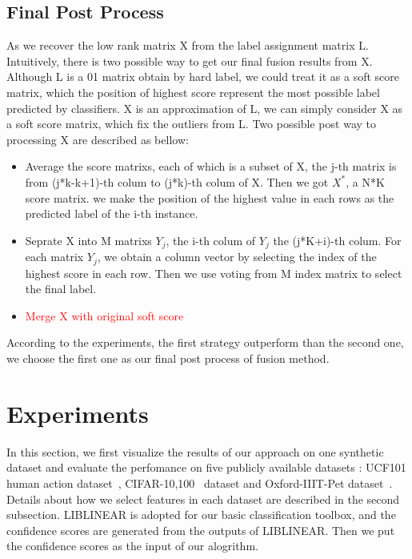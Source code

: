 \documentclass[letterpaper]{article}
\def\yanred{\textcolor{red}}
\begin{document}
\subsection{Final Post Process}
As we recover the low rank matrix X from the label assignment matrix L. Intuitively, there is two possible way to get our final fusion results from X. Although L is a 01 matrix obtain by hard label, we could treat it as a soft score matrix, which the position of highest score represent the most possible label predicted by classifiers. X is an approximation of L, we can simply consider X as a soft score matrix, which fix the outliers from L. Two possible post way to processing X are described as bellow:
\begin{itemize}
  \item Average the score matrixs, each of which is a subset of X, the j-th matrix is from (j*k-k+1)-th colum to (j*k)-th colum of X. Then we got $X^*$, a N*K score matrix. we make the position of the highest value in each rows as the predicted label of the i-th instance.
  \item Seprate X into M matrixs $Y_j$, the i-th colum of $Y_j$ the (j*K+i)-th colum. For each matrix $Y_j$, we obtain a column vector by selecting the index of the highest score in each row. Then we use voting from M index matrix to select the final label.
  \item \yanred{Merge X with original soft score}
\end{itemize}
According to the experiments, the first strategy outperform than the second one, we choose the first one as our final post process of fusion method.


\section{Experiments}

In this section, we first visualize the results of our approach on one synthetic dataset and evaluate the perfomance on five publicly available datasets : UCF101 human action dataset~\cite{soomro2012ucf101}, CIFAR-10,100~\cite{krizhevsky2009learning} dataset and Oxford-IIIT-Pet dataset~\cite{parkhi12a}. 
Details about how we select features in each dataset are described in the second subsection.
LIBLINEAR\cite{fan2008liblinear} is adopted for our basic classification toolbox, and the confidence scores are generated from the outputs of LIBLINEAR. Then we put the confidence scores as the input of our alogrithm.
\end{document}
